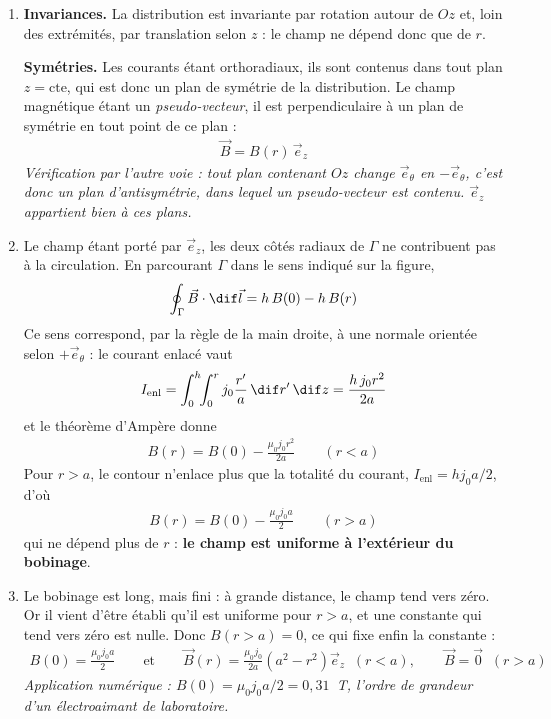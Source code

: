 \begin{correction}

\begin{enumerate}

	\item \textbf{Invariances.} La distribution est invariante par rotation autour de $Oz$ et, loin des extrémités, par translation selon $z$ : le champ ne dépend donc que de $r$.

	\textbf{Symétries.} Les courants étant orthoradiaux, ils sont contenus dans tout plan $z=\mathrm{cte}$, qui est donc un plan de symétrie de la distribution. Le champ magnétique étant un \textit{pseudo-vecteur}, il est perpendiculaire à un plan de symétrie en tout point de ce plan :
	\begin{align*}
		\boxed{\vec{B}=B(r)\,\vec{e}_z}
	\end{align*}
	\textit{Vérification par l'autre voie : tout plan contenant $Oz$ change $\vec{e}_\theta$ en $-\vec{e}_\theta$, c'est donc un plan d'antisymétrie, dans lequel un pseudo-vecteur est contenu. $\vec{e}_z$ appartient bien à ces plans.}

	\item Le champ étant porté par $\vec{e}_z$, les deux côtés radiaux de $\Gamma$ ne contribuent pas à la circulation. En parcourant $\Gamma$ dans le sens indiqué sur la figure,
	\begin{align*}
		\oint_\Gamma \vec{B}\cdot\dif\vec{l}=h\,B(0)-h\,B(r)
	\end{align*}
	Ce sens correspond, par la règle de la main droite, à une normale orientée selon $+\vec{e}_\theta$ : le courant enlacé vaut
	\begin{align*}
		I_{\mathrm{enl}}=\int_0^h\!\!\int_0^r j_0\frac{r'}{a}\,\dif r'\,\dif z=\frac{h\,j_0r^2}{2a}
	\end{align*}
	et le théorème d'Ampère donne
	\begin{align*}
		\boxed{B(r)=B(0)-\frac{\mu_0j_0r^2}{2a}}\qquad(r<a)
	\end{align*}
	Pour $r>a$, le contour n'enlace plus que la totalité du courant, $I_{\mathrm{enl}}=hj_0a/2$, d'où
	\begin{align*}
		B(r)=B(0)-\frac{\mu_0j_0a}{2}\qquad(r>a)
	\end{align*}
	qui ne dépend plus de $r$ : \textbf{le champ est uniforme à l'extérieur du bobinage}.

	\item Le bobinage est long, mais fini : à grande distance, le champ tend vers zéro. Or il vient d'être établi qu'il est uniforme pour $r>a$, et une constante qui tend vers zéro est nulle. Donc $B(r>a)=0$, ce qui fixe enfin la constante :
	\begin{align*}
		\boxed{B(0)=\frac{\mu_0j_0a}{2}}
		\qquad\text{et}\qquad
		\boxed{\vec{B}(r)=\frac{\mu_0j_0}{2a}\left(a^2-r^2\right)\vec{e}_z\;\;(r<a),
		\qquad \vec{B}=\vec{0}\;\;(r>a)}
	\end{align*}
	\textit{Application numérique : $B(0)=\mu_0j_0a/2=0,31$~T, l'ordre de grandeur d'un électroaimant de laboratoire.}


\end{enumerate}
\end{correction}
